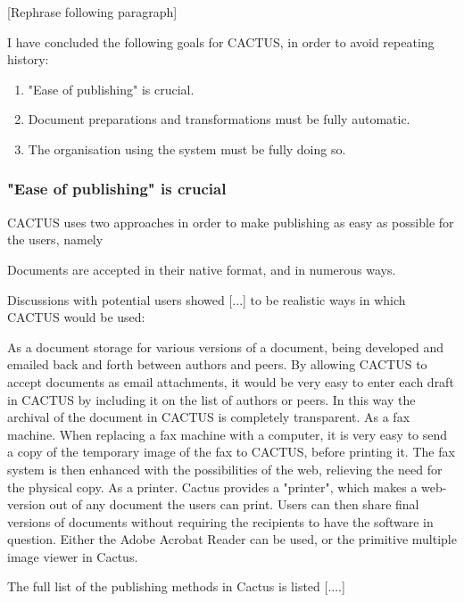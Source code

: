[Rephrase following paragraph]

I have concluded the following goals for CACTUS, in order to avoid
repeating history:

\begin{enumerate}
\item "Ease of publishing" is crucial.
  
\item Document preparations and transformations must be fully
  automatic.
  
\item The organisation using the system must be fully doing so.

\end{enumerate}

\subsubsection{"Ease of publishing" is crucial}

CACTUS uses two approaches in order to make publishing as easy as
possible for the users, namely

\begin{center}
  Documents are accepted in their native format, and in numerous ways.
\end{center}

Discussions with potential users showed [...] to be realistic ways in
which CACTUS would be used:

As a document storage for various versions of a document, being
developed and emailed back and forth between authors and peers.  By
allowing CACTUS to accept documents as email attachments, it would be
very easy to enter each draft in CACTUS by including it on the list of
authors or peers.  In this way the archival of the document in CACTUS
is completely transparent.  As a fax machine.  When replacing a fax
machine with a computer, it is very easy to send a copy of the
temporary image of the fax to CACTUS, before printing it.  The fax
system is then enhanced with the possibilities of the web, relieving
the need for the physical copy.  As a printer.  Cactus provides a
"printer", which makes a web-version out of any document the users can
print.  Users can then share final versions of documents without
requiring the recipients to have the software in question.  Either the
Adobe Acrobat Reader can be used, or the primitive multiple image
viewer in Cactus.

The full list of the publishing methods in Cactus is listed [....]


